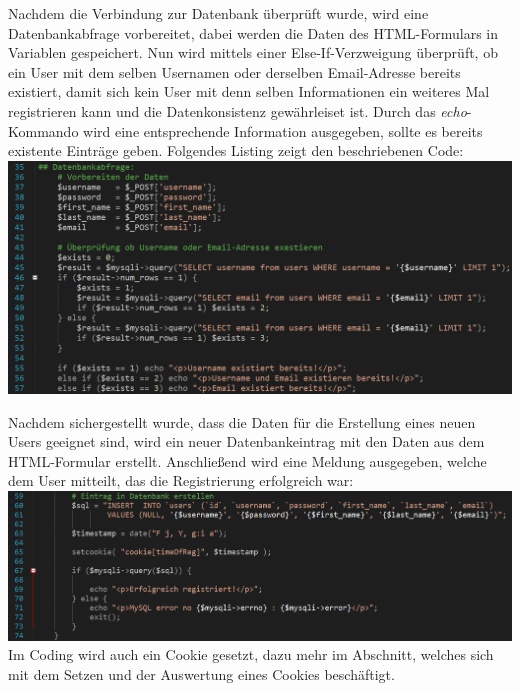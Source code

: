 Nachdem die Verbindung zur Datenbank \"uberpr\"uft wurde, wird eine Datenbankabfrage vorbereitet, dabei werden die Daten des HTML-Formulars in Variablen gespeichert. Nun wird mittels einer Else-If-Verzweigung \"uberpr\"uft, ob ein User mit dem selben Usernamen oder derselben Email-Adresse bereits existiert, damit sich kein User mit denn selben Informationen ein weiteres Mal registrieren kann und die Datenkonsistenz gew\"ahrleiset ist. Durch das \textit{echo}-Kommando wird eine entsprechende Information ausgegeben, sollte es bereits existente Eintr\"age geben. Folgendes Listing zeigt den beschriebenen Code:
\newline	
\includegraphics[width=1\textwidth]{img/vincent/abb13.png}
\newline

Nachdem sichergestellt wurde, dass die Daten f\"ur die Erstellung eines neuen Users geeignet sind, wird ein neuer Datenbankeintrag mit den Daten aus dem HTML-Formular erstellt. Anschlie{\ss}end wird eine Meldung ausgegeben, welche dem User mitteilt, das die Registrierung erfolgreich war:
\newline	
\includegraphics[width=1\textwidth]{img/vincent/abb14.png}
\newline
Im Coding wird auch ein Cookie gesetzt, dazu mehr im Abschnitt, welches sich mit dem Setzen und der Auswertung eines Cookies besch\"aftigt.	

